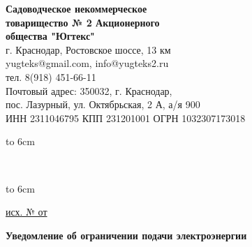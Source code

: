 \noindent\parbox[l][71mm]{80mm}
{
	\begin{center}
		{ \textbf{Садоводческое некоммерческое\\ товарищество
				№  2 Акционерного\\ общества "Югтекс"\\
		}}
		\footnotesize{г. Краснодар, Ростовское шоссе, 13 км\\
			yugteks@gmail.com, info@yugteks2.ru\\
			тел. 8(918) 451-66-11\\
			Почтовый адрес: 350032, г. Краснодар,\\ пос. Лазурный, ул. Октябрьская, 2 А, а/я   900
		}\\
		{ИНН 2311046795 КПП 231201001 ОГРН 1032307173018}
	\end{center}
	\hbox to 6cm{ }}\hfill
\parbox[l][71mm]{65mm}
{ \begin{center}
		{
			\textbf{}\\
			\vspace{3mm}
			{\footnotesize {} }
			
		}
	\end{center}
	\hbox to 6cm{ }}
\linebreak
\vspace{-17mm}

\underline{исх. №  от } 


\vspace{5mm}
\begin{center}
	\Large\textbf{Уведомление 
		об ограничении подачи электроэнергии}
\end{center}
\par
\vspace{5mm}









